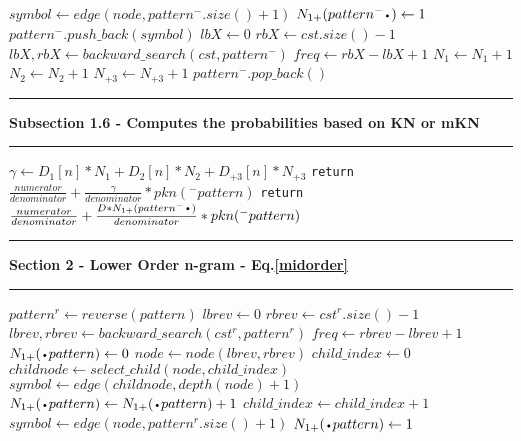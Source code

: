 \documentclass[11pt]{article}
\newcommand\Algphase[1]{%
\vspace*{-.7\baselineskip}\Statex\hspace*{\dimexpr-\algorithmicindent-2pt\relax}\rule{\textwidth}{0.1pt}%
\Statex\hspace*{-\algorithmicindent}\textbf{#1}%
\vspace*{-.7\baselineskip}\Statex\hspace*{\dimexpr-\algorithmicindent-2pt\relax}\rule{\textwidth}{0.1pt}%
}
\newcommand*{\LargerCdot}{\raisebox{-0.75ex}{\scalebox{2}{$\cdot$}}}
\begin{document}
\begin{algorithm*}\footnotesize
\begin{algorithmic}

	\Else
	    \State $symbol\gets edge(node,pattern^{-}.size()+1)$
            \State $N_{1+}(pattern^{-}\LargerCdot)\gets 1$
            	\State $pattern^{-}.push\_back(symbol)$                                                                           \State $lbX\gets 0$
                \State $rbX\gets cst.size()-1$
                \State $lbX, rbX\gets backward\_search(cst,pattern^{-})$
                \State $freq\gets rbX-lbX+1$
                    \State $N_1\gets N_1 + 1$
                	\State $N_2\gets N_2 + 1$
                    \State $N_{+3}\gets N_{+3} + 1$
                \EndIf
                \State $pattern^{-}.pop\_back()$
            \EndIf
        \EndIf
	\EndIf
    \Algphase{ Subsection 1.6 - Computes the probabilities based on KN or mKN}
		\State $\gamma\gets D_1[n]*N_1 + D_2[n]*N_2 + D_{+3}[n]*N_{+3}$
		\State \texttt{return } $\frac{numerator}{denominator}+\frac{\gamma}{denominator}*pkn(^{-}pattern)$
	\Else
		\State \texttt{return } $\frac{numerator}{denominator}+\frac{D*N_{1+}(pattern^{-}\LargerCdot)}{denominator}*pkn(^{-}pattern)$
	\EndIf

\Algphase{Section 2 - Lower Order n-gram - Eq.\ref{midorder}}
    \State $pattern^{r}\gets reverse(pattern)$
    \State $lbrev\gets 0$
    \State $rbrev\gets cst^{r}.size()-1$
    \State $lbrev,rbrev\gets backward\_search(cst^{r},pattern^{r})$
	\State $freq\gets rbrev-lbrev+1$
	\State $N_{1+}(\LargerCdot pattern)\gets 0$
    \State $node\gets node(lbrev,rbrev)$
		\State $child\_index\gets 0$
			\State $childnode\gets select\_child(node,child\_index)$
			\State $symbol\gets edge(childnode,depth(node)+1)$
			    \State $N_{1+}(\LargerCdot pattern)\gets N_{1+}(\LargerCdot pattern)+1$
			\EndIf	
		    \State $child\_index\gets child\_index+1$				
		\EndWhile
	\Else
		\State $symbol\gets edge(node,pattern^{r}.size()+1)$
	   		\State $N_{1+}(\LargerCdot pattern)\gets 1$
		\EndIf	
	\EndIf
	

\end{algorithmic}
\end{algorithm*}
\end{document}
